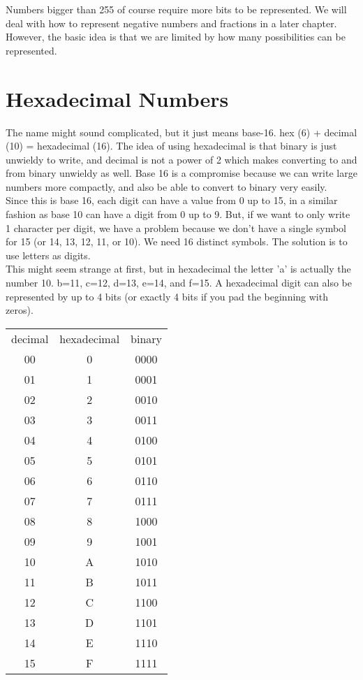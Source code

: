 Numbers bigger than 255 of course require more bits to be represented. We will deal with how to represent negative numbers and fractions in a later chapter. However, the basic idea is that we are limited by how many possibilities can be represented.

\section{Hexadecimal Numbers}


The name might sound complicated, but it just means base-16. hex (6) + decimal (10) = hexadecimal (16). The idea of using hexadecimal is that binary is just unwieldy to write, and decimal is not a power of 2 which makes converting to and from binary unwieldy as well. Base 16 is a compromise because we can write large numbers more compactly, and also be able to convert to binary very easily.\\

Since this is base 16, each digit can have a value from 0 up to 15, in a similar fashion as base 10 can have a digit from 0 up to 9. But, if we want to only write 1 character per digit, we have a problem because we don't have a single symbol for 15 (or 14, 13, 12, 11, or 10). We need 16 distinct symbols. The solution is to use letters as digits.\\

This might seem strange at first, but in hexadecimal the letter 'a' is actually the number 10. b=11, c=12, d=13, e=14, and f=15. A hexadecimal digit can also be represented by up to 4 bits (or exactly 4 bits if you pad the beginning with zeros).

\begin{center}
	\begin{tabular}{c | c | c}
		decimal & hexadecimal & binary \\
		00 & 0 & 0000 \\
		01 & 1 & 0001 \\
		02 & 2 & 0010 \\
		03 & 3 & 0011 \\
		04 & 4 & 0100 \\
		05 & 5 & 0101 \\
		06 & 6 & 0110 \\
		07 & 7 & 0111 \\
		08 & 8 & 1000 \\
		09 & 9 & 1001 \\
		10 & A & 1010 \\
		11 & B & 1011 \\
		12 & C & 1100 \\
		13 & D & 1101 \\
		14 & E & 1110 \\
		15 & F & 1111 \\
	\end{tabular}
\end{center}

